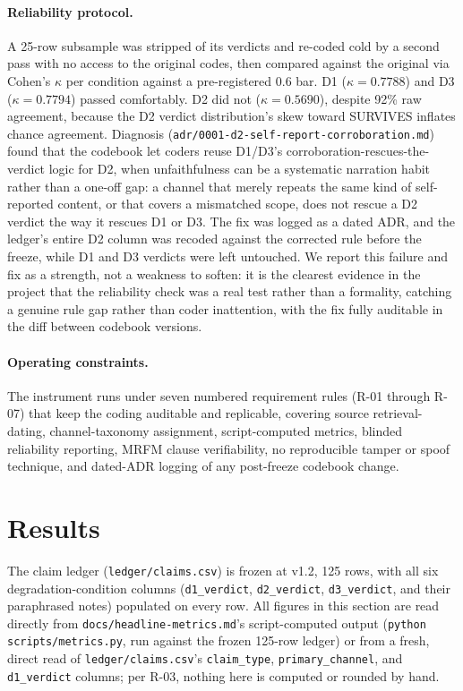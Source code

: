 \documentclass[10pt]{article}
\begin{document}
\paragraph{Reliability protocol.} A 25-row subsample was stripped of its
verdicts and re-coded cold by a second pass with no access to the original
codes, then compared against the original via Cohen's $\kappa$ per
condition against a pre-registered 0.6 bar. D1 ($\kappa=0.7788$) and D3
($\kappa=0.7794$) passed comfortably. D2 did not ($\kappa=0.5690$), despite
92\% raw agreement, because the D2 verdict distribution's skew toward
SURVIVES inflates chance agreement. Diagnosis
(\texttt{adr/0001-d2-self-report-corroboration.md}) found that the codebook
let coders reuse D1/D3's corroboration-rescues-the-verdict logic for D2,
when unfaithfulness can be a systematic narration habit rather than a
one-off gap: a channel that merely repeats the same kind of self-reported
content, or that covers a mismatched scope, does not rescue a D2 verdict the
way it rescues D1 or D3. The fix was logged as a dated ADR, and the ledger's
entire D2 column was recoded against the corrected rule before the freeze,
while D1 and D3 verdicts were left untouched. We report this failure and
fix as a strength, not a weakness to soften: it is the clearest evidence in
the project that the reliability check was a real test rather than a
formality, catching a genuine rule gap rather than coder inattention, with
the fix fully auditable in the diff between codebook versions.

\paragraph{Operating constraints.} The instrument runs under seven numbered
requirement rules (R-01 through R-07) that keep the coding auditable and
replicable, covering source retrieval-dating, channel-taxonomy assignment,
script-computed metrics, blinded reliability reporting, MRFM clause
verifiability, no reproducible tamper or spoof technique, and dated-ADR
logging of any post-freeze codebook change.

\section{Results}
\label{sec:results}

The claim ledger (\texttt{ledger/claims.csv}) is frozen at v1.2, 125 rows,
with all six degradation-condition columns (\texttt{d1\_verdict},
\texttt{d2\_verdict}, \texttt{d3\_verdict}, and their paraphrased notes)
populated on every row. All figures in this section are read directly from
\texttt{docs/headline-metrics.md}'s script-computed output
(\texttt{python scripts/metrics.py}, run against the frozen 125-row ledger)
or from a fresh, direct read of \texttt{ledger/claims.csv}'s
\texttt{claim\_type}, \texttt{primary\_channel}, and \texttt{d1\_verdict}
columns; per R-03, nothing here is computed or rounded by hand.
\end{document}
